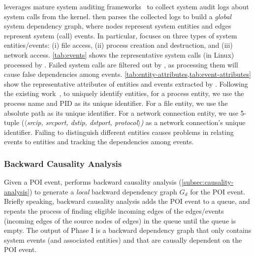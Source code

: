 \tool leverages mature system auditing frameworks~\cite{auditd,etw,dtrace,sysdig} to collect system audit logs about system calls from the kernel. 
\tool then parses the collected logs to build a \emph{global} system dependency graph, where nodes represent system entities and edges represent system (call) events. 
In particular, \tool focuses on three types of system entities/events: 
(i) file access, 
(ii) process creation and destruction, and
(iii) network access.
%
\cref{tab:events} shows the representative system calls (in Linux) processed by \tool.
Failed system calls are filtered out by \tool, as processing them will cause false dependencies among events.
\cref{tab:entity-attributes,tab:event-attributes} show the representative attributes of entities and events extracted by \tool.
%
Following the existing work~\cite{liu2018priotracker,gao2018aiql,gao2018saql}, to uniquely identify entities,
for a process entity, we use the process name and PID as its unique identifier.
For a file entity, we use the absolute path as its unique identifier. 
For a network 
connection entity, we use 5-tuple (\emph{$\langle$srcip, srcport, dstip, dstport, protocol$\rangle$)} as a network 
connection's unique identifier. 
Failing to distinguish different entities causes problems in relating events to entities and tracking the dependencies among events.




\subsubsection{Backward Causality Analysis}
\label{subsubsec:backward-causality}

Given a POI event, \tool performs backward causality analysis (\cref{subsec:causality-analysis}) to generate a \emph{local} backward dependency graph $G_d$ for the POI event.
%
Briefly speaking, backward causality analysis adds the POI event to a queue, and repeats the process of finding eligible incoming edges of the edges/events (\ie incoming edges of the source nodes of edges) in the queue until the queue is empty. 
The output of Phase I is a backward dependency graph that only contains system events (and associated entities) and that are causally dependent on the POI event.






